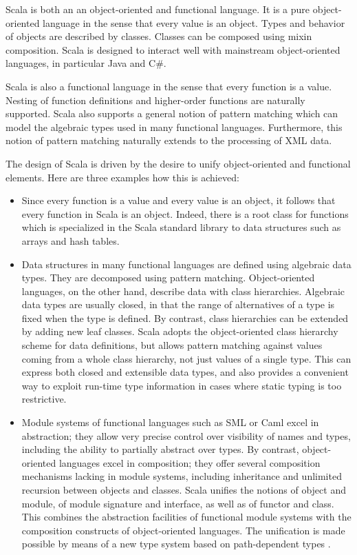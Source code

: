 Scala is both an an object-oriented and functional language.  It is a
pure object-oriented language in the sense that every value is an
object. Types and behavior of objects are described by
classes. Classes can be composed using mixin composition.  Scala is
designed to interact well with mainstream object-oriented languages,
in particular Java and C\#.

Scala is also a functional language in the sense that every function
is a value. Nesting of function definitions and higher-order functions
are naturally supported. Scala also supports a general notion of
pattern matching which can model the algebraic types used in many
functional languages. Furthermore, this notion of pattern matching
naturally extends to the processing of XML data.

The design of Scala is driven by the desire to unify object-oriented
and functional elements. Here are three examples how this is achieved:
\begin{itemize}
\item
Since every function is a value and every value is an object, it
follows that every function in Scala is an object. Indeed, there is a
root class for functions which is specialized in the Scala standard
library to data structures such as arrays and hash tables.
\item
Data structures in many functional languages are defined using
algebraic data types. They are decomposed using pattern matching.
Object-oriented languages, on the other hand, describe data with class
hierarchies. Algebraic data types are usually closed, in that the
range of alternatives of a type is fixed when the type is defined.  By
contrast, class hierarchies can be extended by adding new leaf
classes.  Scala adopts the object-oriented class hierarchy scheme for
data definitions, but allows pattern matching against values coming
from a whole class hierarchy, not just values of a single type.
This can express both closed and extensible data types, and also
provides a convenient way to exploit run-time type information in
cases where static typing is too restrictive.
\item
Module systems of functional languages such as SML or Caml excel in
abstraction; they allow very precise control over visibility of names
and types, including the ability to partially abstract over types.  By
contrast, object-oriented languages excel in composition; they offer
several composition mechanisms lacking in module systems, including
inheritance and unlimited recursion between objects and classes.
Scala unifies the notions of object and module, of module signature
and interface, as well as of functor and class. This combines the
abstraction facilities of functional module systems with the
composition constructs of object-oriented languages. The unification
is made possible by means of a new type system based on path-dependent
types \cite{odersky-et-al:fool10}.
\end{itemize}

